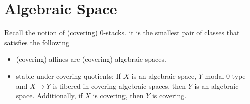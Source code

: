 \section{Algebraic Space}
Recall the notion of (covering) 0-stacks. it is the smallest pair of classes that satisfies the following
\begin{itemize}
	\item (covering) affines are (covering) algebraic spaces. %
	\item stable under covering quotients: If $X$ is an algebraic space, $Y$ modal 0-type and $X \to Y$ is fibered in covering algebraic spaces, then $Y$ is an algebraic space. Additionally, if $X$ is covering, then $Y$ is covering.
\end{itemize}
